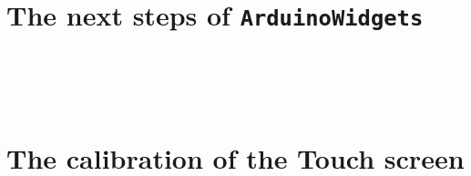 \documentclass[a4paper,11pt]{extarticle}
\begin{document}
\newpage
\section{The next steps of \texttt{ArduinoWidgets}}

~\\

~\\

~\\


\newpage
\section{The calibration of the Touch screen} 

~\\

~\\

~\\


\end{document}
